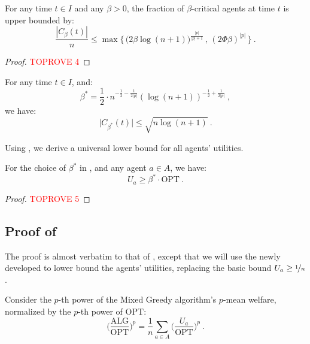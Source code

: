 \documentclass[11pt,letterpaper]{article}
\newcommand{\OPT}{\mathrm{OPT}}
\newcommand{\ALG}{\mathrm{ALG}}
\newcommand{\utility}{U}
\begin{document}
\begin{lemma}
	\label{lem:critical-agent-number}
	For any time $t\in I$ and any $\beta > 0$, the fraction of $\beta$-critical agents at time $t$ is upper bounded by:
	\[
		\frac{|C_\beta(t)|}{n} \le \max \Big\{ \, \big(2 \beta \log(n+1) \big)^{\frac{|p|}{|p|+1}} \,,\, (2\Phi\beta)^{|p|} \,\Big\}
		~.
	\]
\end{lemma}

\begin{proof}\textcolor{red}{TOPROVE 4}\end{proof}


\begin{corollary}
	\label{cor:critical-threshold}
	For any time $t \in I$, and:
	\begin{equation}
		\label{eq:beta-star}
		\beta^* = \frac{1}{2} \cdot  n^{-\frac{1}{2}-\frac{1}{2|p|}} (\log (n+1))^{-\frac{1}{2}+\frac{1}{2|p|}}
		~,	
	\end{equation}
	we have:
	\[
		\big|C_{\beta^*} (t)\big| \le \sqrt{n \log (n+1)}
		~.
	\]
\end{corollary}


Using , we derive a universal lower bound for all agents' utilities.


\begin{lemma}
	\label{lem:negative-infinity-main-lemma}
	For the choice of $\beta^*$ in , and any agent $a \in A$, we have:
	\[
		\utility_a \ge \beta^* \cdot \OPT
		~.
	\]
\end{lemma}

\begin{proof}\textcolor{red}{TOPROVE 5}\end{proof}











\subsection{Proof of }

The proof is almost verbatim to that of , except that we will use the newly developed  to lower bound the agents' utilities, replacing the basic bound $\utility_a \ge \nicefrac{1}{n}$.

Consider the $p$-th power of the Mixed Greedy algorithm's $p$-mean welfare, normalized by the $p$-th power of $\OPT$:
\[
	\bigg( \frac{\ALG}{\OPT} \bigg)^p = \frac{1}{n} \sum_{a\in A} \bigg( \frac{\utility_a}{\OPT} \bigg)^p
	~.
\]
\end{document}
